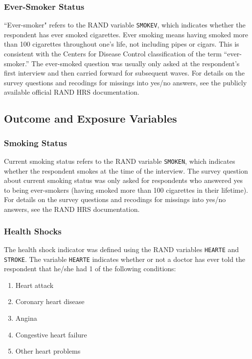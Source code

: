 \subsubsection{Ever-Smoker Status}
\label{supsec:ever_smoking}
``Ever-smoker" refers to the RAND variable {\tt SMOKEV}, which indicates whether the respondent has ever smoked cigarettes. Ever smoking means having smoked more than 100 cigarettes throughout one's life, not including pipes or cigars. This is consistent with the Centers for Disease Control classification of the term ``ever-smoker.''\cite{Jamal2016} The ever-smoked question was usually only asked at the respondent's first interview and then carried forward for subsequent waves. For details on the survey questions and recodings for missings into yes/no answers, see the publicly available official RAND HRS documentation.%


\subsection{Outcome and Exposure Variables}
\label{supsec:outcome_exposure}

\subsubsection{Smoking Status}
\label{supsec:smoken}
Current smoking status refers to the RAND variable {\tt SMOKEN}, which indicates whether the respondent smokes at the time of the interview. The survey question about current smoking status was only asked for respondents who answered yes to being ever-smokers (having smoked more than 100 cigarettes in their lifetime). For details on the survey questions and recodings for missings into yes/no answers, see the RAND HRS documentation. %


\subsubsection{Health Shocks}
\label{supsec:cv_def}
The health shock indicator was defined using the RAND variables {\tt HEARTE} and {\tt STROKE}. The variable {\tt HEARTE} indicates whether or not a doctor has ever told the respondent that he/she had 1 of the following conditions:
\begin{enumerate}
	\item Heart attack
	\item Coronary heart disease
	\item Angina
	\item Congestive heart failure
	\item Other heart problems\\
\end{enumerate}

